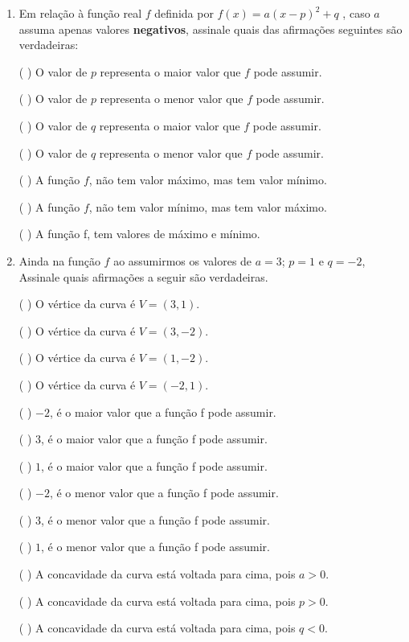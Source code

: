 \documentclass[10 pt,usenames,dvipsnames, oneside]{article}
\begin{document}
\begin{enumerate}
\item {} 
Em relação à função real \(f\) definida por \(f(x)=a(x-p)^2+q\) , caso \(a\) assuma apenas valores \textbf{negativos}, assinale quais das afirmações seguintes são verdadeiras:

({ }{ }{ }) O valor de \(p\) representa o maior valor que \(f\) pode assumir.

({ }{ }{ }) O valor de \(p\) representa o menor valor que \(f\) pode assumir.

({ }{ }{ }) O valor de \(q\) representa o maior valor que \(f\) pode assumir.

({ }{ }{ }) O valor de \(q\) representa o menor valor que \(f\) pode assumir.

({ }{ }{ }) A função \(f\), não tem valor máximo, mas tem valor mínimo.

({ }{ }{ }) A função \(f\), não tem valor mínimo, mas tem valor máximo.

({ }{ }{ }) A função f, tem valores de máximo e mínimo.

\item {} 
Ainda na função \(f\) ao assumirmos os valores de \(a=3\);  \(p=1\) e \(q=-2\), Assinale quais afirmações a seguir são verdadeiras.

({ }{ }{ }) O vértice da curva é \(V=(3,1)\).

({ }{ }{ }) O vértice da curva é \(V=(3,-2)\).

({ }{ }{ }) O vértice da curva é \(V=(1,-2)\).

({ }{ }{ }) O vértice da curva é \(V=(-2,1)\).

({ }{ }{ }) \(-2\), é o maior valor que a função f pode assumir.

({ }{ }{ }) \(3\), é o maior valor que a função f pode assumir.

({ }{ }{ }) \(1\), é o maior valor que a função f pode assumir.

({ }{ }{ }) \(-2\), é o menor valor que a função f pode assumir.

({ }{ }{ }) \(3\), é o menor valor que a função f pode assumir.

({ }{ }{ }) \(1\), é o menor valor que a função f pode assumir.

({ }{ }{ }) A concavidade da curva está voltada para cima, pois \(a>0\).

({ }{ }{ }) A concavidade da curva está voltada para cima, pois \(p>0\).

({ }{ }{ }) A concavidade da curva está voltada para cima, pois \(q<0\).

\end{enumerate}
\end{document}
